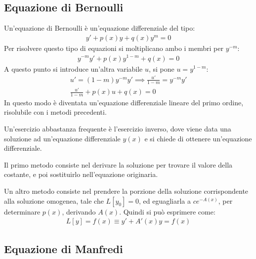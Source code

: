 \documentclass{article}
\numberwithin{equation}{subsection}
\begin{document}
\subsection{Equazione di Bernoulli}

Un'equazione di Bernoulli è un'equazione differenziale del tipo:
\begin{gather}
    y'+p(x)y+q(x)y^m=0
\end{gather}
Per risolvere questo tipo di equazioni si moltiplicano ambo i membri per $y^{-m}$:
\begin{gather*}
    y^{-m}y'+p(x)y^{1-m}+q(x)=0
\end{gather*}
A questo punto si introduce un'altra variabile $u$, si pone $u=y^{1-m}$:
\begin{gather*}
    u'=(1-m)y^{-m}y'\implies \frac{u'}{1-m}=y^{-m}y'\\
    \displaystyle\frac{u'}{1-m}+p(x)u+q(x)=0
\end{gather*}
In questo modo è diventata un'equazione differenziale lineare del primo ordine, risolubile con i metodi precedenti. 


Un'esercizio abbastanza frequente è l'esercizio inverso, dove viene data una soluzione ad un'equazione differenziale $y(x)$ e si chiede di ottenere un'equazione differenziale. 

Il primo metodo consiste nel derivare la soluzione per trovare il valore della costante, e poi sostituirlo nell'equazione originaria. 

Un altro metodo consiste nel prendere la porzione della soluzione corrispondente alla soluzione omogenea, tale che $L[y_0]=0$, ed eguagliarla a $ce^{-A(x)}$, per determinare $p(x)$, derivando $A(x)$. 
Quindi si può esprimere come:
\begin{gather*}
    L[y]=f(x)\equiv y'+A'(x)y=f(x)
\end{gather*}

\subsection{Equazione di Manfredi}
\end{document}
